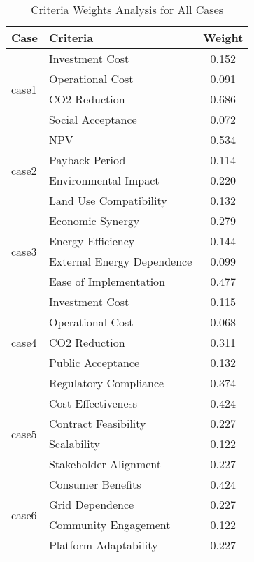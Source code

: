 \begin{table}[htbp]
\centering
\caption{Criteria Weights Analysis for All Cases}
\begin{tabular}{llc}
\hline
Case & Criteria & Weight \\
\hline
\multirow{4}{*}{case1} & Investment Cost & 0.152 \\
& Operational Cost & 0.091 \\
& CO2 Reduction & 0.686 \\
& Social Acceptance & 0.072 \\
\hline
\multirow{4}{*}{case2} & NPV & 0.534 \\
& Payback Period & 0.114 \\
& Environmental Impact & 0.220 \\
& Land Use Compatibility & 0.132 \\
\hline
\multirow{4}{*}{case3} & Economic Synergy & 0.279 \\
& Energy Efficiency & 0.144 \\
& External Energy Dependence & 0.099 \\
& Ease of Implementation & 0.477 \\
\hline
\multirow{5}{*}{case4} & Investment Cost & 0.115 \\
& Operational Cost & 0.068 \\
& CO2 Reduction & 0.311 \\
& Public Acceptance & 0.132 \\
& Regulatory Compliance & 0.374 \\
\hline
\multirow{4}{*}{case5} & Cost-Effectiveness & 0.424 \\
& Contract Feasibility & 0.227 \\
& Scalability & 0.122 \\
& Stakeholder Alignment & 0.227 \\
\hline
\multirow{4}{*}{case6} & Consumer Benefits & 0.424 \\
& Grid Dependence & 0.227 \\
& Community Engagement & 0.122 \\
& Platform Adaptability & 0.227 \\
\hline
\end{tabular}
\label{tab:weights}
\end{table}

